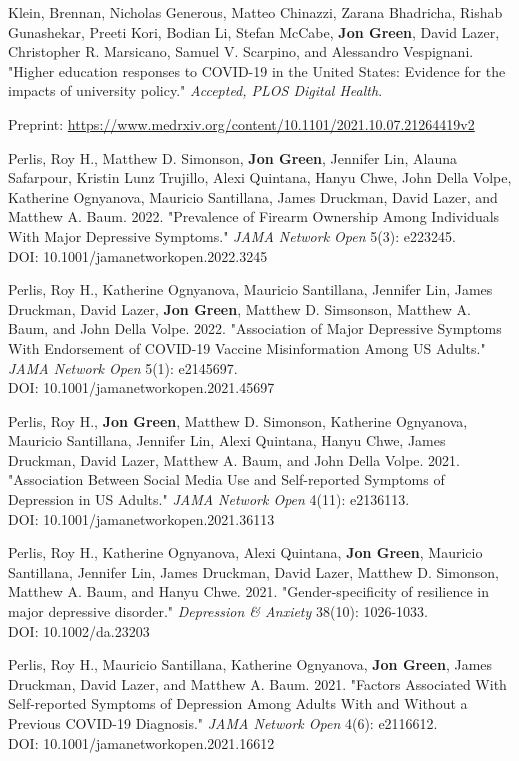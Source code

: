 \documentclass[letterpaper]{article}
\renewenvironment{itemize}{
  \begin{list}{}{
    \setlength{\leftmargin}{1.5em}
  }
}{
  \end{list}
}
\begin{document}
\begin{etaremune}

\item Klein, Brennan, Nicholas Generous, Matteo Chinazzi, Zarana Bhadricha, Rishab Gunashekar, Preeti Kori, Bodian Li, Stefan McCabe, \textbf{Jon Green}, David Lazer, Christopher R. Marsicano, Samuel V. Scarpino, and Alessandro Vespignani. "Higher education responses to COVID-19 in the United States: Evidence for the impacts of university policy." \textit{Accepted, PLOS Digital Health}.
\begin{itemize}
\item Preprint: \url{https://www.medrxiv.org/content/10.1101/2021.10.07.21264419v2}
\end{itemize}

\item  Perlis, Roy H., Matthew D. Simonson, \textbf{Jon Green}, Jennifer Lin, Alauna Safarpour, Kristin Lunz Trujillo, Alexi Quintana, Hanyu Chwe, John Della Volpe, Katherine Ognyanova, Mauricio Santillana,  James Druckman, David Lazer, and Matthew A. Baum. 2022. "Prevalence of Firearm Ownership Among Individuals With Major Depressive Symptoms." \textit{JAMA Network Open} 5(3): e223245. \\
DOI: 10.1001/jamanetworkopen.2022.3245

\item  Perlis, Roy H., Katherine Ognyanova, Mauricio Santillana, Jennifer Lin, James Druckman, David Lazer,  \textbf{Jon Green}, Matthew D. Simsonson, Matthew A. Baum, and John Della Volpe. 2022. "Association of Major Depressive Symptoms With Endorsement of COVID-19 Vaccine Misinformation Among US Adults." \textit{JAMA Network Open} 5(1): e2145697. \\
DOI: 10.1001/jamanetworkopen.2021.45697

\item  Perlis, Roy H., \textbf{Jon Green}, Matthew D. Simonson, Katherine Ognyanova, Mauricio Santillana, Jennifer Lin, Alexi Quintana, Hanyu Chwe, James Druckman, David Lazer, Matthew A. Baum, and John Della Volpe. 2021. "Association Between Social Media Use and Self-reported Symptoms of Depression in US Adults." \textit{JAMA Network Open} 4(11): e2136113. \\
DOI: 10.1001/jamanetworkopen.2021.36113

\item  Perlis, Roy H., Katherine Ognyanova, Alexi Quintana, \textbf{Jon Green}, Mauricio Santillana, Jennifer Lin, James Druckman, David Lazer, Matthew D. Simonson, Matthew A. Baum, and Hanyu Chwe. 2021. "Gender-specificity of resilience in major depressive disorder." \textit{Depression \& Anxiety} 38(10): 1026-1033. \\
DOI: 10.1002/da.23203

\item  Perlis, Roy H., Mauricio Santillana, Katherine Ognyanova, \textbf{Jon Green}, James Druckman, David Lazer, and Matthew A. Baum. 2021. "Factors Associated With Self-reported Symptoms of Depression Among Adults With and Without a Previous COVID-19 Diagnosis." \textit{JAMA Network Open} 4(6): e2116612. \\
DOI: 10.1001/jamanetworkopen.2021.16612
\end{etaremune}
\end{document}
